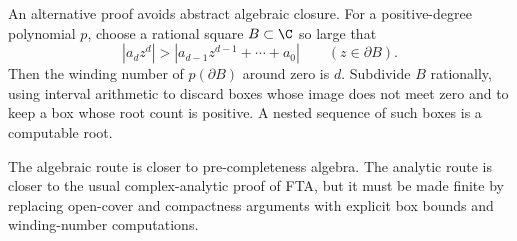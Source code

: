\begin{proposition}\label{prop:fta-analytic-route}
An alternative proof avoids abstract algebraic closure.  For a positive-degree
polynomial \(p\), choose a rational square \(B\subset\C\) so large that
\[
  |a_d z^d| >
  |a_{d-1}z^{d-1}+\cdots+a_0|
  \qquad (z\in\partial B).
\]
Then the winding number of \(p(\partial B)\) around zero is \(d\).  Subdivide
\(B\) rationally, using interval arithmetic to discard boxes whose image
does not meet zero and to keep a box whose root count is positive.  A nested
sequence of such boxes is a computable root.
\end{proposition}

\begin{remark}
The algebraic route is closer to pre-completeness algebra.  The analytic
route is closer to the usual complex-analytic proof of FTA, but it must be
made finite by replacing open-cover and compactness arguments with explicit
box bounds and winding-number computations.
\end{remark}
